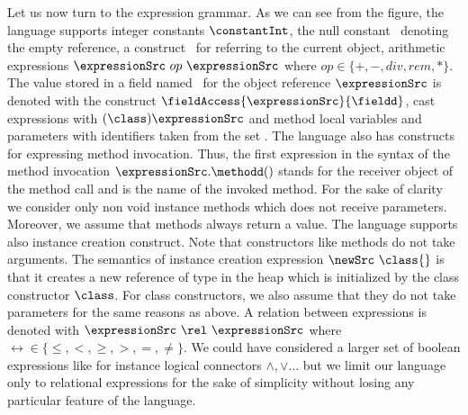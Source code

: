 Let us now turn to the expression grammar. As we can see from the figure, the language supports 
    integer constants $\constantInt$, the null constant \Mynull \ 
    denoting  the empty reference, a construct \this \ for referring to the current object,  
    arithmetic expressions  $\expressionSrc \ op \ \expressionSrc$ where $op \in  \{+ , - , div , rem, * \}$.
    The value stored in a field named \fieldd \ for the object reference $\expressionSrc $ is denoted with
    the construct  $ \fieldAccess{\expressionSrc}{\fieldd} $, cast expressions with   $(\class) \expressionSrc$
    and method local variables  and parameters with identifiers taken from the set  \var.  
    The language also has constructs for expressing method invocation. 
    Thus, the first expression in the syntax of the method invocation
    $\expressionSrc.\methodd()$ stands for the receiver object of the method
    call and \methodd{} is the name of the invoked method. For the sake of clarity we consider only non void  instance  methods which does not 
    receive parameters. Moreover, we assume that methods always return a
    value. The language supports also instance creation construct. Note that constructors like methods do not take arguments.
    The semantics of instance creation expression $\newSrc \ \class{}$  is that it 
    creates a new reference of type \class{} in the heap  which is initialized by the class constructor $\class$.
    For class constructors, we also assume that they do not take parameters
    for the same reasons as above.   A relation between    expressions is denoted with
    $\expressionSrc \ \rel \ \expressionSrc $ where $\rel  \in \{ \le, < ,  \ge, >, = , \neq \}$.  
    We could have considered a larger set of boolean expressions like for instance logical connectors $\wedge, \vee \ldots$
     but we limit our language only to  relational expressions for the sake of simplicity without losing any particular feature of the language.
